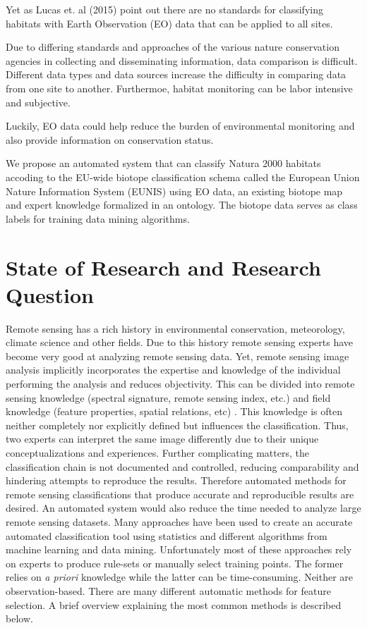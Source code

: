 \documentclass[authoryear, review,12pt,number]{elsarticle}
\begin{document}
Yet as Lucas et. al (2015) point out there are no standards for classifying
habitats with Earth Observation (EO) data that can be applied to all sites. 

Due to differing standards and approaches of the various nature conservation
agencies in collecting and disseminating information, data comparison is
difficult. Different data types and data sources increase the difficulty in
comparing data from one site to another. Furthermoe, habitat monitoring can
be labor intensive and subjective.

Luckily, EO data could help reduce the burden of environmental monitoring and
also provide information on conservation status.

We propose an automated system that can classify Natura 2000 habitats
accoding to the EU-wide biotope classification schema called the European Union
Nature Information System (EUNIS) using EO data, an existing biotope map and
expert knowledge formalized in an ontology. The biotope data serves as class
labels for training data mining algorithms.

\section{State of Research and Research Question}
Remote sensing has a rich history in environmental conservation, meteorology,
climate science and other fields. Due to this history remote sensing experts
have become very good at analyzing remote sensing data. Yet, remote sensing
image analysis implicitly incorporates the expertise and knowledge of the
individual performing the analysis and reduces objectivity. This can be divided
into remote sensing knowledge (spectral signature, remote sensing index, etc.)
and field knowledge (feature properties, spatial relations, etc)
\citep{Andres2013a}. This knowledge is often neither completely nor explicitly
defined but influences the classification. Thus, two experts can interpret the
same image differently due to their unique conceptualizations and experiences.
Further complicating matters, the classification chain is not documented and
controlled, reducing comparability and hindering attempts to reproduce the
results\citep{Arvor2013}. Therefore automated methods for remote sensing
classifications that produce accurate and reproducible results are desired.
An automated system would also reduce the time needed to analyze large
remote sensing datasets. Many approaches have been used to create an accurate
automated classification tool using statistics and different algorithms
from machine learning and data mining. Unfortunately most of these approaches
rely on experts to produce rule-sets or manually select training points. The
former relies on \emph{a priori} knowledge while the latter can be
time-consuming.
Neither are observation-based. There are many different automatic methods
for feature selection. A brief overview explaining the most common methods is
described below.
\end{document}
